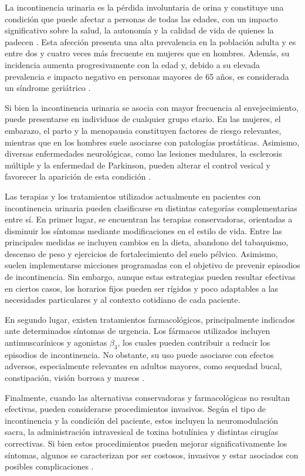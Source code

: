 \documentclass[12pt,a4paper]{article}
\begin{document}
La incontinencia urinaria es la pérdida involuntaria de orina y constituye una condición que
puede afectar a personas de todas las edades, con un impacto significativo sobre la salud, la
autonomía y la calidad de vida de quienes la padecen \cite{abrams2002standardisation}. Esta
afección presenta una alta prevalencia en la población adulta y es entre dos y cuatro veces más
frecuente en mujeres que en hombres. Además, su incidencia aumenta progresivamente con la edad
y, debido a su elevada prevalencia e impacto negativo en personas mayores de 65 años, es
considerada un síndrome geriátrico \cite{robles2006incontinencia}.

Si bien la incontinencia urinaria se asocia con mayor frecuencia al envejecimiento, puede
presentarse en individuos de cualquier grupo etario. En las mujeres, el embarazo, el parto y la
menopausia constituyen factores de riesgo relevantes, mientras que en los hombres suele asociarse
con patologías prostáticas. Asimismo, diversas enfermedades neurológicas, como las lesiones
medulares, la esclerosis múltiple y la enfermedad de Parkinson, pueden alterar el control vesical
y favorecer la aparición de esta condición \cite{leslie2024incontinence}.

Las terapias y los tratamientos utilizados actualmente en pacientes con incontinencia urinaria
pueden clasificarse en distintas categorías complementarias entre sí. En primer lugar, se
encuentran las terapias conservadoras, orientadas a disminuir los síntomas mediante modificaciones
en el estilo de vida. Entre las principales medidas se incluyen cambios en la dieta, abandono del
tabaquismo, descenso de peso y ejercicios de fortalecimiento del suelo pélvico. Asimismo, suelen
implementarse micciones programadas con el objetivo de prevenir episodios de incontinencia. Sin
embargo, aunque estas estrategias pueden resultar efectivas en ciertos casos, los horarios fijos
pueden ser rígidos y poco adaptables a las necesidades particulares y al contexto cotidiano de
cada paciente.

En segundo lugar, existen tratamientos farmacológicos, principalmente indicados ante determinados
síntomas de urgencia. Los fármacos utilizados incluyen antimuscarínicos y agonistas $\beta_3$, los
cuales pueden contribuir a reducir los episodios de incontinencia. No obstante, su uso puede
asociarse con efectos adversos, especialmente relevantes en adultos mayores, como sequedad bucal,
constipación, visión borrosa y mareos \cite{eau2025femaleLUTS}.

Finalmente, cuando las alternativas conservadoras y farmacológicas no resultan efectivas, pueden
considerarse procedimientos invasivos. Según el tipo de incontinencia y la condición del paciente,
estos incluyen la neuromodulación sacra, la administración intravesical de toxina botulínica y
distintas cirugías correctivas. Si bien estos procedimientos pueden mejorar significativamente los
síntomas, algunos se caracterizan por ser costosos, invasivos y estar asociados con posibles
complicaciones \cite{eau2025femaleLUTS}.
\end{document}

